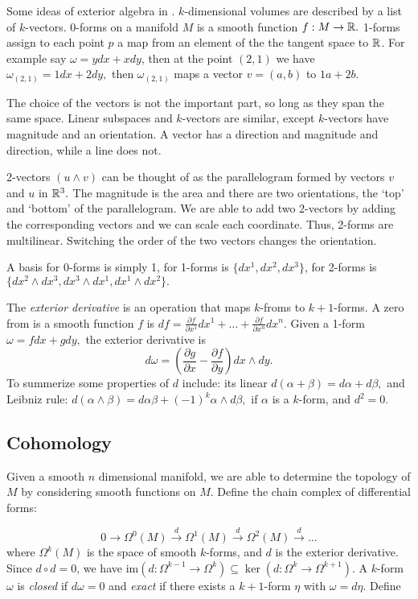 Some ideas of exterior algebra in \cite{Crane:2013}. $k$-dimensional volumes are described by a list of $k$-vectors.
0-forms on a manifold $M$ is a smooth function $f:M\rightarrow \mathbb{R}.$
1-forms assign to each point $p$ a map from an element of the the tangent space to $\mathbb{R}$.
For example say $\omega = ydx+xdy$, then at the point $(2,1)$ we have
$\omega_{(2,1)}=1dx+2dy,$ then $\omega_{(2,1)}$ maps a vector $v=(a,b)$ to
$1a+2b.$

The choice of the vectors is not the important part, so long as they span the same space.
Linear subspaces and $k$-vectors are similar, except $k$-vectors have magnitude and an orientation.
A vector has a direction and magnitude and direction, while a line does not.

2-vectors $(u\land v)$ can be thought of as the parallelogram formed by vectors $v$ and $u$ in $\mathbb{R}^3.$
The magnitude is the area and there are two orientations, the `top' and `bottom' of the parallelogram.
We are able to add two 2-vectors by adding the corresponding vectors and we can scale each coordinate.
Thus, 2-forms are multilinear.
Switching the order of the two vectors changes the orientation.

A basis for 0-forms is simply 1, for 1-forms is $\{dx^1,dx^2,dx^3\}$,
for 2-forms is $\{dx^2\land dx^3, dx^3\land dx^1, dx^1\land dx^2\}.$

The \emph{exterior derivative} is an operation that maps $k$-froms to $k+1$-forms.
A zero from is a smooth function $f$ is $df=\frac{\partial f}{\partial x^1}dx^1+\ldots + \frac{\partial f}{\partial x^n}dx^n.$ Given a 1-form $\omega=fdx+gdy,$ the exterior derivative is
$$d\omega=\left(\frac{\partial g}{\partial x}-\frac{\partial f}{\partial y}\right)dx\land dy.$$
To summerize some properties of $d$ include:
its linear $d(\alpha +\beta)=d\alpha +d\beta,$ and Leibniz rule:
$d(\alpha \land \beta)=d\alpha \beta + (-1)^k \alpha \land d\beta,$ if $\alpha$ is a $k$-form,
and $d^2=0.$

\subsection{Cohomology}

Given a smooth $n$ dimensional manifold, we are able to determine the topology of $M$ by considering
smooth functions on $M$.
Define the chain complex of differential forms:

$$0\rightarrow \Omega^0(M) \xrightarrow{d} \Omega^1(M) \xrightarrow{d} \Omega^2(M)\xrightarrow{d}\ldots$$
where $\Omega^k(M)$ is the space of smooth $k$-forms, and $d$ is the exterior derivative.
Since $d\circ d=0$, we have im$(d:\Omega^{k-1}\rightarrow \Omega^k)\subseteq \ker(d:\Omega^{k}\rightarrow \Omega^{k+1}).$
A $k$-form $\omega$ is \emph{closed} if $d\omega=0$ and \emph{exact} if there exists
a $k+1$-form $\eta$ with $\omega=d\eta.$
Define

